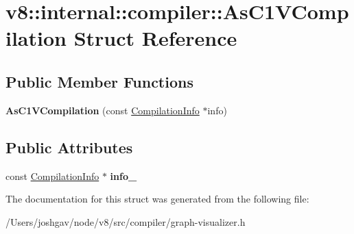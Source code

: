 \hypertarget{structv8_1_1internal_1_1compiler_1_1_as_c1_v_compilation}{}\section{v8\+:\+:internal\+:\+:compiler\+:\+:As\+C1\+V\+Compilation Struct Reference}
\label{structv8_1_1internal_1_1compiler_1_1_as_c1_v_compilation}
\subsection*{Public Member Functions}
\begin{DoxyCompactItemize}
\item 
{\bfseries As\+C1\+V\+Compilation} (const \hyperlink{classv8_1_1internal_1_1_compilation_info}{Compilation\+Info} $\ast$info)\hypertarget{structv8_1_1internal_1_1compiler_1_1_as_c1_v_compilation_aef631cb34c8afb739b6129d1cb8a5ae0}{}\label{structv8_1_1internal_1_1compiler_1_1_as_c1_v_compilation_aef631cb34c8afb739b6129d1cb8a5ae0}

\end{DoxyCompactItemize}
\subsection*{Public Attributes}
\begin{DoxyCompactItemize}
\item 
const \hyperlink{classv8_1_1internal_1_1_compilation_info}{Compilation\+Info} $\ast$ {\bfseries info\+\_\+}\hypertarget{structv8_1_1internal_1_1compiler_1_1_as_c1_v_compilation_a961e6b9228a064d2e3a3a417c2969fdd}{}\label{structv8_1_1internal_1_1compiler_1_1_as_c1_v_compilation_a961e6b9228a064d2e3a3a417c2969fdd}

\end{DoxyCompactItemize}


The documentation for this struct was generated from the following file\+:\begin{DoxyCompactItemize}
\item 
/\+Users/joshgav/node/v8/src/compiler/graph-\/visualizer.\+h\end{DoxyCompactItemize}

